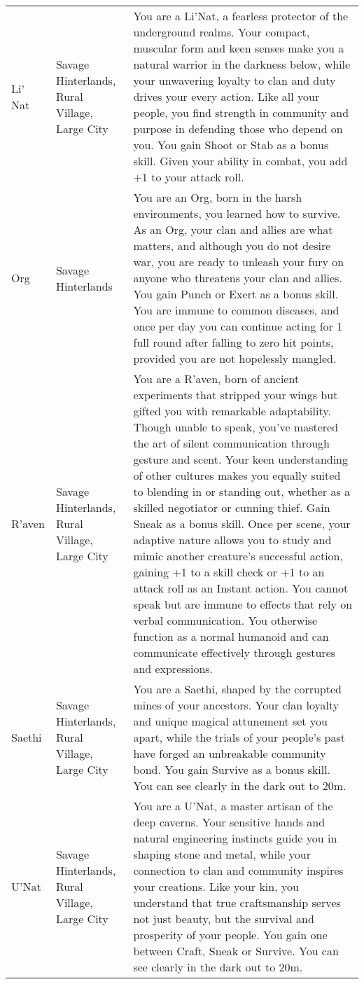 \documentclass[itdr/core]{subfiles}
\begin{document}
\begin{longtable}{p{}p{}p{}}
Li' Nat & Savage Hinterlands, Rural Village, Large City & You are a Li'Nat, a fearless protector of the underground realms. Your compact, muscular form and keen senses make you a natural warrior in the darkness below, while your unwavering loyalty to clan and duty drives your every action. Like all your people, you find strength in community and purpose in defending those who depend on you. You gain Shoot or Stab as a bonus skill. Given your ability in combat, you add +1 to your attack roll. \\

Org & Savage Hinterlands & You are an Org, born in the harsh environments, you learned how to survive. As an Org, your clan and allies are what matters, and although you do not desire war, you are ready to unleash your fury on anyone who threatens your clan and allies. You gain Punch or Exert as a bonus skill. You are immune to common diseases, and once per day you can continue acting for 1 full round after falling to zero hit points, provided you are not hopelessly mangled. \\

R'aven & Savage Hinterlands, Rural Village, Large City & You are a R'aven, born of ancient experiments that stripped your wings but gifted you with remarkable adaptability. Though unable to speak, you've mastered the art of silent communication through gesture and scent. Your keen understanding of other cultures makes you equally suited to blending in or standing out, whether as a skilled negotiator or cunning thief. Gain Sneak as a bonus skill. Once per scene, your adaptive nature allows you to study and mimic another creature's successful action, gaining +1 to a skill check or +1 to an attack roll as an Instant action. You cannot speak but are immune to effects that rely on verbal communication. You otherwise function as a normal humanoid and can communicate effectively through gestures and expressions. \\
Saethi & Savage Hinterlands, Rural Village, Large City & You are a Saethi, shaped by the corrupted mines of your ancestors. Your clan loyalty and unique magical attunement set you apart, while the trials of your people's past have forged an unbreakable community bond. You gain Survive as a bonus skill. You can see clearly in the dark out to 20m. \\
U'Nat & Savage Hinterlands, Rural Village, Large City & You are a U'Nat, a master artisan of the deep caverns. Your sensitive hands and natural engineering instincts guide you in shaping stone and metal, while your connection to clan and community inspires your creations. Like your kin, you understand that true craftsmanship serves not just beauty, but the survival and prosperity of your people. You gain one between Craft, Sneak or Survive. You can see clearly in the dark out to 20m. \\
\hline
\end{longtable}
\end{document}
